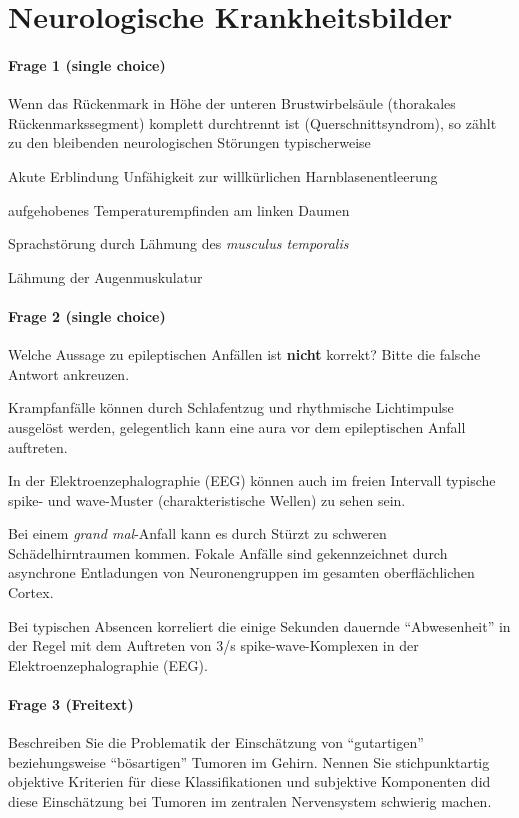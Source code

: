 \section*{Neurologische Krankheitsbilder}

\paragraph{Frage 1 (single choice)}

Wenn das Rückenmark in Höhe der unteren Brustwirbelsäule (thorakales Rückenmarkssegment) komplett durchtrennt ist (Querschnittsyndrom), so zählt zu den bleibenden neurologischen Störungen typischerweise

\begin{benumerate}
  \item Akute Erblindung
  \bolditem Unfähigkeit zur willkürlichen Harnblasenentleerung
  \item aufgehobenes Temperaturempfinden am linken Daumen
  \item Sprachstörung durch Lähmung des \emph{musculus temporalis}
  \item Lähmung der Augenmuskulatur
\end{benumerate}

\paragraph{Frage 2 (single choice)}

Welche Aussage zu epileptischen Anfällen ist \textbf{nicht} korrekt? Bitte die falsche Antwort ankreuzen.
\begin{benumerate}
  \item Krampfanfälle können durch Schlafentzug und rhythmische Lichtimpulse ausgelöst werden, gelegentlich kann eine aura vor dem epileptischen Anfall auftreten.
  \item In der Elektroenzephalographie (EEG) können auch im freien Intervall typische spike- und wave-Muster (charakteristische Wellen) zu sehen sein.
  \item Bei einem \emph{grand mal}-Anfall kann es durch Stürzt zu schweren Schädelhirntraumen kommen.
  \bolditem Fokale Anfälle sind gekennzeichnet durch asynchrone Entladungen von Neuronengruppen im gesamten oberflächlichen Cortex.
  \item Bei typischen Absencen korreliert die einige Sekunden dauernde ``Abwesenheit'' in der Regel mit dem Auftreten von 3/s spike-wave-Komplexen in der Elektroenzephalographie (EEG).
\end{benumerate}

\paragraph{Frage 3 (Freitext)}

Beschreiben Sie die Problematik der Einschätzung von ``gutartigen'' beziehungsweise ``bösartigen'' Tumoren im Gehirn. Nennen Sie stichpunktartig objektive Kriterien für diese Klassifikationen und subjektive Komponenten did diese Einschätzung bei Tumoren im zentralen Nervensystem schwierig machen.